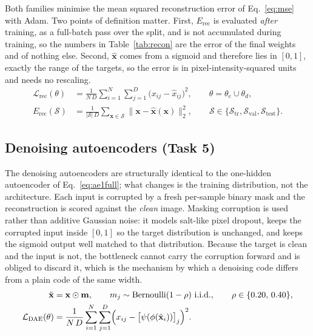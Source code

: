 \documentclass[11pt,a4paper]{article}
\begin{document}
Both families minimise the mean squared reconstruction error of Eq.~\eqref{eq:mse} with Adam.  Two
points of definition matter.  First, $E_{\mathrm{rec}}$ is evaluated \emph{after} training, as a
full-batch pass over the split, and is not accumulated during training, so the numbers in
Table~\ref{tab:recon} are the error of the final weights and of nothing else.  Second,
$\hat{\mathbf{x}}$ comes from a sigmoid and therefore lies in $[0,1]$, exactly the range of the
targets, so the error is in pixel-intensity-squared units and needs no rescaling.
\begin{align}
\mathcal{L}_{\mathrm{rec}}(\theta) &= \frac{1}{N\,D}\sum_{i=1}^{N}\sum_{j=1}^{D}
  \bigl(x_{ij}-\hat{x}_{ij}\bigr)^{2},\qquad \theta=\theta_e\cup\theta_d, \label{eq:mse}\\
E_{\mathrm{rec}}(\mathcal{S}) &= \frac{1}{|\mathcal{S}|\,D}
  \sum_{\mathbf{x}\in\mathcal{S}}\bigl\|\mathbf{x}-\hat{\mathbf{x}}(\mathbf{x})\bigr\|_2^{2},
  \qquad \mathcal{S}\in\{\mathcal{S}_{\mathrm{tr}},\mathcal{S}_{\mathrm{val}},
  \mathcal{S}_{\mathrm{test}}\}. \label{eq:recsplit}
\end{align}

\subsection{Denoising autoencoders (Task 5)}\label{sec:arch:dae}
The denoising autoencoders are structurally identical to the one-hidden autoencoder of
Eq.~\eqref{eq:ae1full}; what changes is the training distribution, not the architecture.  Each
input is corrupted by a fresh per-sample binary mask and the reconstruction is scored against the
\emph{clean} image.  Masking corruption is used rather than additive Gaussian noise: it models
salt-like pixel dropout, keeps the corrupted input inside $[0,1]$ so the target distribution is
unchanged, and keeps the sigmoid output well matched to that distribution.  Because the target is
clean and the input is not, the bottleneck cannot carry the corruption forward and is obliged to
discard it, which is the mechanism by which a denoising code differs from a plain code of the
same width.
\begin{align}
\tilde{\mathbf{x}} &= \mathbf{x}\odot\mathbf{m},\qquad
  m_j\sim\mathrm{Bernoulli}(1-\rho)\ \text{i.i.d.},\qquad \rho\in\{0.20,\,0.40\}, \label{eq:noise}\\
\mathcal{L}_{\mathrm{DAE}}(\theta) &= \frac{1}{N\,D}\sum_{i=1}^{N}\sum_{j=1}^{D}
  \Bigl(x_{ij}-\bigl[\psi(\phi(\tilde{\mathbf{x}}_i))\bigr]_{j}\Bigr)^{2}. \label{eq:dae}
\end{align}
\end{document}
